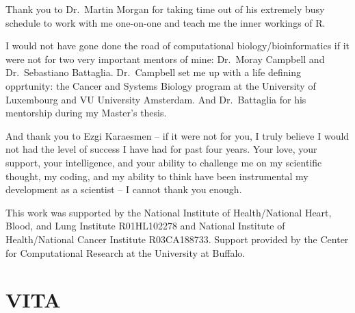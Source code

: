 \documentclass[]{DissertateOSU}
\begin{document}
Thank you to Dr.~Martin Morgan for taking time out of his extremely busy
schedule to work with me one-on-one and teach me the inner workings of
R.

I would not have gone done the road of computational
biology/bioinformatics if it were not for two very important mentors of
mine: Dr.~Moray Campbell and Dr.~Sebastiano Battaglia. Dr.~Campbell set
me up with a life defining opprtunity: the Cancer and Systems Biology
program at the University of Luxembourg and VU University Amsterdam. And
Dr.~Battaglia for his mentorship during my Master's thesis.

And thank you to Ezgi Karaesmen -- if it were not for you, I truly
believe I would not had the level of success I have had for past four
years. Your love, your support, your intelligence, and your ability to
challenge me on my scientific thought, my coding, and my ability to
think have been instrumental my development as a scientist -- I cannot
thank you enough.

This work was supported by the National Institute of Health/National
Heart, Blood, and Lung Institute R01HL102278 and National Institute of
Health/National Cancer Institute R03CA188733. Support provided by the
Center for Computational Research at the University at Buffalo.

\newpage

\pagestyle{plain} \fancyhead[L]{} \fancyhead[R]{}
\fancyfoot[C]{\thepage} \chapter*{VITA}
 \singlespacing

 
\end{document}
